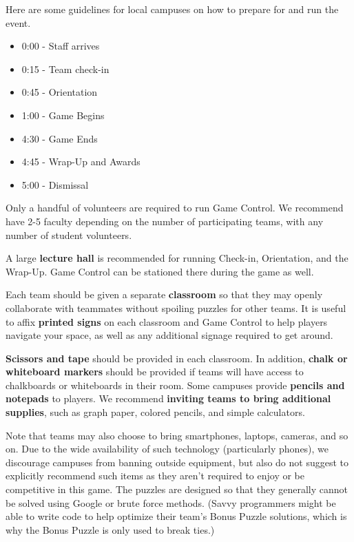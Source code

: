 Here are some guidelines for local campuses on how to prepare for and
run the event.

\small

\begin{itemize}
  \item 0:00 - Staff arrives
  \item 0:15 - Team check-in
  \item 0:45 - Orientation
  \item 1:00 - Game Begins
  \item 4:30 - Game Ends
  \item 4:45 - Wrap-Up and Awards
  \item 5:00 - Dismissal
\end{itemize}


Only a handful of volunteers are required to run Game Control. We recommend
have 2-5 faculty depending on the number of participating teams, with
any number of student volunteers.


A large \textbf{lecture hall} is recommended for running Check-in,
Orientation, and the Wrap-Up. Game Control can be stationed there during
the game as well.

Each team should be given a separate \textbf{classroom} so that they may
openly collaborate with teammates without spoiling puzzles for other teams.
It is useful to affix \textbf{printed signs} on each classroom and Game
Control to help players navigate your space, as well as any additional
signage required to get around.


\textbf{Scissors and tape} should be provided in each classroom.
In addition, \textbf{chalk or whiteboard markers} should be provided if
teams will have access to chalkboards or whiteboards in their room.
Some campuses provide \textbf{pencils and notepads} to players.
We recommend \textbf{inviting teams to bring additional supplies}, such as
graph paper, colored pencils, and simple calculators. 

Note that teams may also choose to bring smartphones, laptops, cameras,
and so on. Due to the wide availability of such technology (particularly
phones), we discourage campuses from banning outside equipment, but also
do not suggest to explicitly recommend such items as they aren't required
to enjoy or be competitive in this game. The puzzles are
designed so that they generally cannot be solved using Google or 
brute force methods. (Savvy programmers might be able to write code to
help optimize their team's Bonus Puzzle solutions, which is why the Bonus
Puzzle is only used to break ties.)

